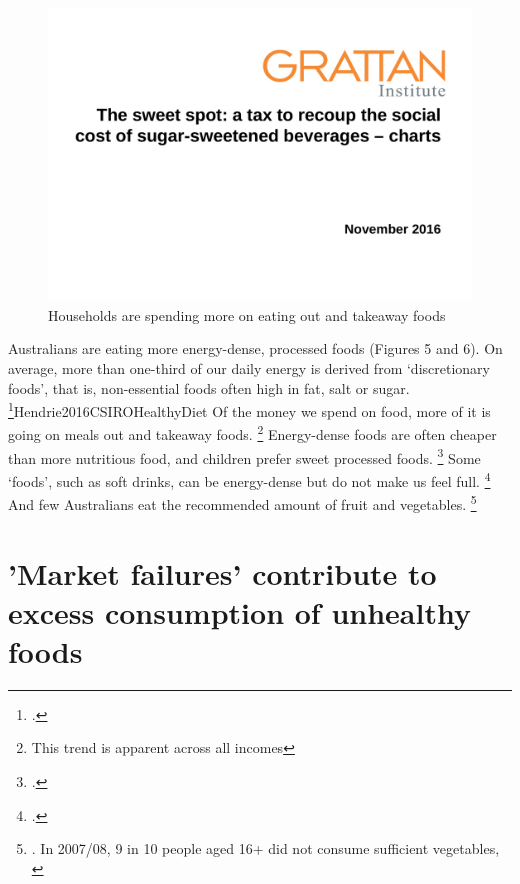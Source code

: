 \documentclass[embargoed]{grattan}
\begin{document}
\begin{figure}
\caption{Households are spending more on eating out and takeaway foods}

\includegraphics[page=7]{atlas/ObesityCharts}

\end{figure}


Australians are eating more energy-dense, processed foods (Figures 5 and 6).
On average, more than one-third of our daily energy is derived from `discretionary foods', that is, non-essential foods often high in fat, salt or sugar. \footcite{ABS20144364055007AustralianHealth}{Hendrie2016CSIROHealthyDiet} Of the money we spend on food, more of it is going on meals out and takeaway foods.%
\footnote{This trend is apparent across all incomes} Energy-dense foods are often cheaper than more nutritious food, and children prefer sweet processed foods.%
\footcite{Roberto2015Patchyprogressobesity} Some `foods', such as soft drinks, can be energy-dense but do not make us feel full.%
\footcites{Mozaffarian2016politicssciencesoda}{Fletcher2011Aresoftdrink}{Malik2006Intakesugarsweetened}{Ruyter2012trialsugarfree}{Johnson2009Dietarysugarsintake} And few Australians eat the recommended amount of fruit and vegetables.%
\footnote{\textcite{Hendrie2016CSIROHealthyDiet}.
In 2007/08, 9 in 10 people aged 16+ did not consume sufficient vegetables, \textcite{Health2012Australiasfood}}

\section{'Market failures’ contribute to excess consumption of unhealthy foods }\label{many-of-the-factors-contributing-to-excess-energy-in-are-market-failures}
\end{document}
